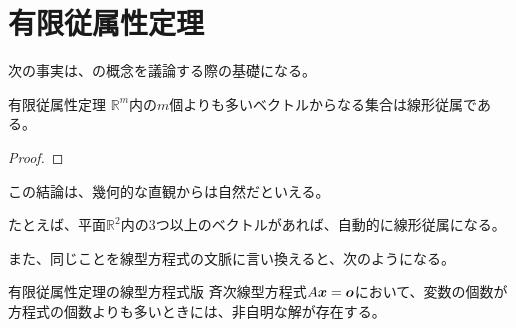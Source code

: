 \documentclass[../../../topic_linear-algebra]{subfiles}
\begin{document}
\sectionline
\section{有限従属性定理}

次の事実は、の概念を議論する際の基礎になる。

\begin{theorem}{有限従属性定理}\label{thm:finite-dependency}
  $\mathbb{R}^m$内の$m$個よりも多いベクトルからなる集合は線形従属である。
\end{theorem}

\begin{proof}
\end{proof}

\br

この結論は、幾何的な直観からは自然だといえる。

たとえば、平面$\mathbb{R}^2$内の3つ以上のベクトルがあれば、自動的に線形従属になる。

\br

また、同じことを線型方程式の文脈に言い換えると、次のようになる。

\begin{theorem}{有限従属性定理の線型方程式版}
  斉次線型方程式$A\vb*{x} = \vb*{o}$において、変数の個数が方程式の個数よりも多いときには、非自明な解が存在する。
\end{theorem}
\end{document}
